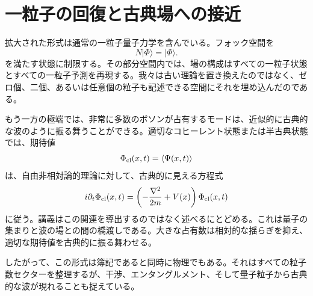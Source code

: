 \begin{classroomqa}
\end{classroomqa}

\begin{classroomqa}
\end{classroomqa}

\section{一粒子の回復と古典場への接近}

拡大された形式は通常の一粒子量子力学を含んでいる。フォック空間を
\begin{equation}
N|\Phi\rangle=|\Phi\rangle.
\end{equation}
を満たす状態に制限する。その部分空間内では、場の構成はすべての一粒子状態とすべての一粒子予測を再現する。我々は古い理論を置き換えたのではなく、ゼロ個、二個、あるいは任意個の粒子も記述できる空間にそれを埋め込んだのである。

もう一方の極端では、非常に多数のボソンが占有するモードは、近似的に古典的な波のように振る舞うことができる。適切なコヒーレント状態または半古典状態では、期待値
\begin{equation}
\Phi_{\rm cl}(x,t)=\langle\Psi(x,t)\rangle
\end{equation}
は、自由非相対論的理論に対して、古典的に見える方程式
\begin{equation}
i\partial_t\Phi_{\rm cl}(x,t)
=\left(-\frac{\nabla^2}{2m}+V(x)\right)\Phi_{\rm cl}(x,t)
\label{eq:l07-classical-schrodinger}
\end{equation}
に従う。講義はこの関連を導出するのではなく述べるにとどめる。これは量子の集まりと波の場との間の橋渡しである。大きな占有数は相対的な揺らぎを抑え、適切な期待値を古典的に振る舞わせる。

したがって、この形式は簿記であると同時に物理でもある。それはすべての粒子数セクターを整理するが、干渉、エンタングルメント、そして量子粒子から古典的な波が現れることも捉えている。

